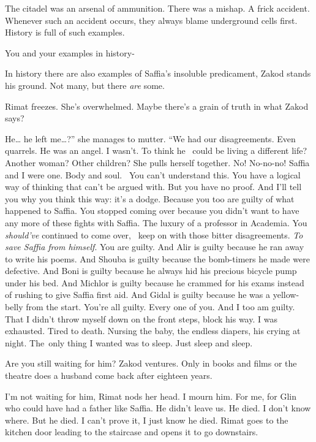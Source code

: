 \documentclass[12pt]{book}
\begin{document}
{\textquotedbl}The citadel was an arsenal of ammunition. There was a mishap. A frick accident. Whenever such an accident
occurs, they always blame underground cells first. History is full of such examples.{\textquotedbl}

{\textquotedbl}You and your examples in history-{\textquotedbl}

{\textquotedbl}In history there are also examples of Saffia's insoluble predicament,{\textquotedbl} Zakod stands his
ground. {\textquotedbl}Not many, but there \textit{are} some.{\textquotedbl}

Rimat freezes. She's overwhelmed. Maybe there's a grain of truth in what Zakod says? \

{\textquotedbl}He{\dots} he left me{\dots}?'' she manages to mutter. ``We had our disagreements. Even quarrels. He was
an angel. I wasn't. To think he \ could be living a different life? Another woman? Other children?{\textquotedbl} She
pulls herself together. {\textquotedbl}No! No-no-no! Saffia and I were one. Body and soul.~ You can't understand this.
You have a logical way of thinking that can't be argued with. But you have no proof. And I'll tell you why you think
this way: it's a dodge. Because you too are guilty of what happened to Saffia. You stopped coming over because you
didn't want to have any more of these fights with Saffia. The luxury of a professor in Academia. You \textit{should've}
continued to come over, \ keep on with those bitter disagreements. \textit{To save Saffia from himself}. You are
guilty. And Alir is guilty because he ran away to write his poems. And Shouba is guilty because the bomb-timers he made
were defective. And Boni is guilty because he always hid his precious bicycle pump under his bed. And Michlor is guilty
because he crammed for his exams instead of rushing to give Saffia first aid. And Gidal is guilty because he was a
yellow-belly from the start. You're all guilty. Every one of you. And I too am guilty. That I didn't throw myself down
on the front steps, block his way. I was exhausted. Tired to death. Nursing the baby, the endless diapers, his crying
at night. The~only thing I wanted was to sleep. Just sleep and sleep.{\textquotedbl}

{\textquotedbl}Are you still waiting for him?{\textquotedbl} Zakod ventures. {\textquotedbl}Only in books and films or
the theatre does a husband come back after eighteen years.{\textquotedbl}

{\textquotedbl}I'm not waiting for him,{\textquotedbl} Rimat nods her head. {\textquotedbl}I mourn him. For me, for Glin
who could have had a father like Saffia. He didn't leave us. He died. I don't know where. But he died. I can't prove
it, I just know he died.{\textquotedbl} Rimat goes to the kitchen door leading to the staircase and opens it to go
downstairs.
\end{document}
